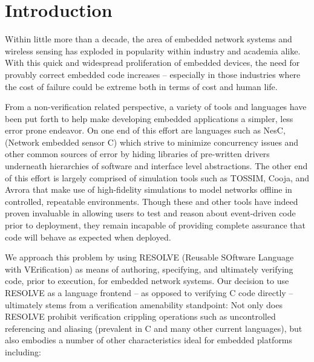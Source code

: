 \section{Introduction}
\label{sec:intro}
Within little more than a decade, the area of embedded network systems and wireless sensing has exploded in popularity within industry and academia alike. With this quick and widespread proliferation of embedded devices, the need for provably correct embedded code increases -- especially in those industries where the cost of failure could be extreme both in terms of cost and human life. 

From a non-verification related perspective, a variety of tools and languages have been put forth to help make developing embedded applications a simpler, less error prone endeavor. On one end of this effort are languages such as NesC\cite{Gay:2003}, (Network embedded sensor C) which strive to minimize concurrency issues and other common sources of error by hiding libraries of pre-written drivers underneath hierarchies of software and interface level abstractions. The other end of this effort is largely comprised of simulation tools such as TOSSIM\cite{levis:2003}, Cooja\cite{osterlind:2006}, and Avrora\cite{titzer:2005} that make use of high-fidelity simulations to model networks offline in controlled, repeatable environments. Though these and other tools have indeed proven invaluable in allowing users to test and reason about event-driven code prior to deployment, they remain incapable of providing complete assurance that code will behave as expected when deployed.

We approach this problem by using RESOLVE (Reusable SOftware Language with VErification) as means of authoring, specifying, and ultimately verifying code, prior to execution, for embedded network systems. Our decision to use RESOLVE as a language frontend -- as opposed to verifying C code directly -- ultimately stems from a verification amenability standpoint: Not only does RESOLVE prohibit verification crippling operations such as uncontrolled referencing and aliasing (prevalent in C and many other current languages)\cite{kulczycki:2004}, but also embodies a number of other characteristics ideal for embedded platforms including:

